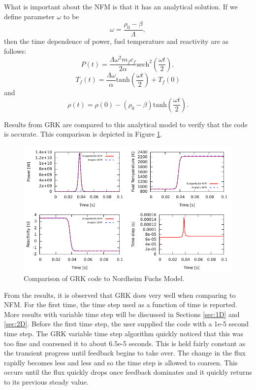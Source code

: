 \documentclass{ansconf}
\numberwithin{equation}{section}
\begin{document}
What is important about the NFM is that it has an analytical solution. If we define parameter $\omega$ to be
\begin{equation}
	\omega = \frac{\rho_0-\beta}{\Lambda},
\end{equation}
then the time dependence of power, fuel temperature and reactivity are as follows:
\begin{equation}
	P\left(t\right) = \frac{\Lambda\omega^2m_fc_f}{2\alpha}\mathrm{sech}^2\left(\frac{\omega t}{2}\right),
\end{equation}
\begin{equation}
	T_f\left(t\right) = \frac{\Lambda\omega}{\alpha}\mathrm{tanh}\left(\frac{\omega t}{2}\right) + T_f\left(0\right)
\end{equation}
and
\begin{equation}
	\rho\left(t\right) = \rho\left(0\right) - \left(\rho_0 - \beta\right)\mathrm{tanh}\left(\frac{\omega t}{2}\right).
\end{equation}

Results from GRK are compared to this analytical model to verify that the code is accurate.  This comparison is depicted in Figure \ref{fig:nordheim_fuchs}.
\begin{figure} 
\centering \includegraphics[scale=1.00]{./figs/nordheimfuchs.pdf}
\caption{Comparison of GRK code to Nordheim Fuchs Model.}
\label{fig:nordheim_fuchs}
\end{figure}
From the results, it is observed that GRK does very well when comparing to NFM. For the first time, the time step used as a function of time is reported. More results with variable time step will be discussed in Sections \ref{sec:1D} and \ref{sec:2D}. Before the first time step, the user supplied the code with a 1e-5 second time step. The GRK variable time step algorithm quickly noticed that this was too fine and coarsened it to about 6.5e-5 seconds. This is held fairly constant as the transient progress until feedback begins to take over. The change in the flux rapidly becomes less and less and so the time step is allowed to coarsen. This occurs until the flux quickly drops once feedback dominates and it quickly returns to its previous steady value.
\end{document}
